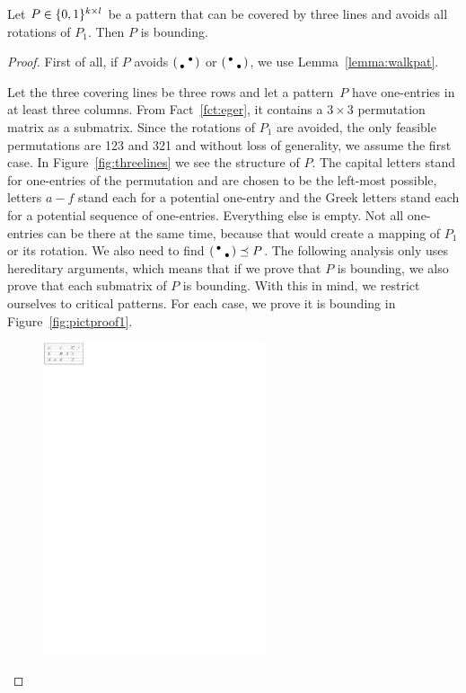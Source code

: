 \begin{lemma}
\label{lemma:three}
Let $P\in\{0,1\}^{k\times l}$ be a pattern that can be covered by three lines and avoids all rotations of $P_1$. Then $P$ is bounding.
\end{lemma}
\begin{proof}
First of all, if $P$ avoids $\left(\begin{smallmatrix} &\bullet\\\bullet& \end{smallmatrix}\right)$ or $\left(\begin{smallmatrix}\bullet& \\ &\bullet\end{smallmatrix}\right)$, we use Lemma~\ref{lemma:walkpat}.

Let the three covering lines be three rows and let a pattern~$P$ have one-entries in at least three columns. From Fact~\ref{fct:eger}, it contains a $3\times3$ permutation matrix as a submatrix. Since the rotations of $P_1$ are avoided, the only feasible permutations are 123 and 321 and without loss of generality, we assume the first case. In Figure~\ref{fig:threelines} we see the structure of $P$. The capital letters stand for one-entries of the permutation and are chosen to be the left-most possible, letters $a-f$ stand each for a potential one-entry and the Greek letters stand each for a potential sequence of one-entries. Everything else is empty. Not all one-entries can be there at the same time, because that would create a mapping of $P_1$ or its rotation. We also need to find $\left(\begin{smallmatrix}\bullet& \\ &\bullet\end{smallmatrix}\right)\preceq P$. The following analysis only uses hereditary arguments, which means that if we prove that $P$ is bounding, we also prove that each submatrix of $P$ is bounding. With this in mind, we restrict ourselves to critical patterns. For each case, we prove it is bounding in Figure~\ref{fig:pictproof1}.
\begin{figure}[!ht]
	\centering
	\includegraphics[width=65mm]{img/threelines.pdf}

\end{figure}
\end{proof}
